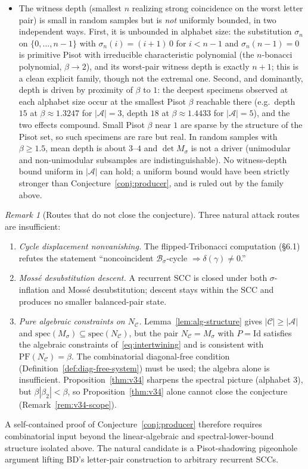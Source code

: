 \documentclass[11pt]{article}
\theoremstyle{plain}
\theoremstyle{definition}
\theoremstyle{remark}
\newtheorem{remark}[theorem]{Remark}
\newcommand{\A}{\mathcal{A}}
\newcommand{\B}{\mathcal{B}}
\newcommand{\C}{\mathcal{C}}
\newcommand{\PFroot}{\mathrm{PF}}
\newcommand{\spec}{\mathrm{spec}}
\begin{document}
\begin{itemize}[leftmargin=*]
\item The witness depth (smallest $n$ realizing strong coincidence on the worst letter pair) is small in random samples but is \emph{not} uniformly bounded, in two independent ways. First, it is unbounded in alphabet size: the substitution $\sigma_n$ on $\{0,\dots,n-1\}$ with $\sigma_n(i)=(i{+}1)\,0$ for $i<n-1$ and $\sigma_n(n{-}1)=0$ is primitive Pisot with irreducible characteristic polynomial (the $n$-bonacci polynomial, $\beta\to 2$), and its worst-pair witness depth is exactly $n{+}1$; this is a clean explicit family, though not the extremal one. Second, and dominantly, depth is driven by proximity of $\beta$ to $1$: the deepest specimens observed at each alphabet size occur at the smallest Pisot $\beta$ reachable there (e.g.\ depth $15$ at $\beta\approx 1.3247$ for $|\A|=3$, depth $18$ at $\beta\approx 1.4433$ for $|\A|=5$), and the two effects compound. Small Pisot $\beta$ near $1$ are sparse by the structure of the Pisot set, so such specimens are rare but real. In random samples with $\beta\ge 1.5$, mean depth is about $3$--$4$ and $\det M_\sigma$ is not a driver (unimodular and non-unimodular subsamples are indistinguishable). No witness-depth bound uniform in $|\A|$ can hold; a uniform bound would have been strictly stronger than Conjecture~\ref{conj:producer}, and is ruled out by the family above.
\end{itemize}

\begin{remark}[Routes that do not close the conjecture]\label{rem:dead-routes}
Three natural attack routes are insufficient:
\begin{enumerate}[label=(\roman*)]
\item \emph{Cycle displacement nonvanishing.} The flipped-Tribonacci computation (\S6.1) refutes the statement ``noncoincident $\B_\sigma$-cycle $\Rightarrow\delta(\gamma)\ne 0$.''
\item \emph{Moss\'e desubstitution descent.} A recurrent SCC is closed under both $\sigma$-inflation and Moss\'e desubstitution; descent stays within the SCC and produces no smaller balanced-pair state.
\item \emph{Pure algebraic constraints on $N_\C$.} Lemma~\ref{lem:alg-structure} gives $|\C|\ge|\A|$ and $\spec(M_\sigma)\subseteq\spec(N_\C)$, but the pair $N_\C=M_\sigma$ with $P=\mathrm{Id}$ satisfies the algebraic constraints of~\eqref{eq:intertwining} and is consistent with $\PFroot(N_\C)=\beta$. The combinatorial diagonal-free condition (Definition~\ref{def:diag-free-system}) must be used; the algebra alone is insufficient. Proposition~\ref{thm:v34} sharpens the spectral picture (alphabet 3), but $\beta|\beta_2|<\beta$, so Proposition~\ref{thm:v34} alone cannot close the conjecture (Remark~\ref{rem:v34-scope}).
\end{enumerate}
A self-contained proof of Conjecture~\ref{conj:producer} therefore requires combinatorial input beyond the linear-algebraic and spectral-lower-bound structure isolated above. The natural candidate is a Pisot-shadowing pigeonhole argument lifting BD's letter-pair construction to arbitrary recurrent SCCs.
\end{remark}
\end{document}
